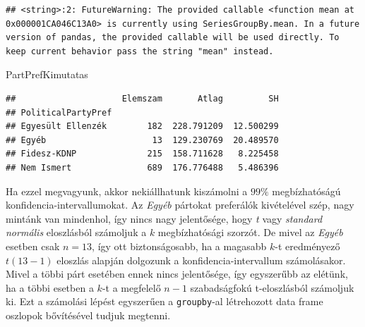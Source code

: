 \documentclass[
]{book}
\newenvironment{Shaded}{\begin{snugshade}}{\end{snugshade}}
\newcommand{\NormalTok}[1]{#1}
\begin{document}
\begin{verbatim}
## <string>:2: FutureWarning: The provided callable <function mean at 0x000001CA046C13A0> is currently using SeriesGroupBy.mean. In a future version of pandas, the provided callable will be used directly. To keep current behavior pass the string "mean" instead.
\end{verbatim}

\begin{Shaded}
\begin{Highlighting}[]
\NormalTok{PartPrefKimutatas}
\end{Highlighting}
\end{Shaded}

\begin{verbatim}
##                     Elemszam       Atlag         SH
## PoliticalPartyPref                                 
## Egyesült Ellenzék        182  228.791209  12.500299
## Egyéb                     13  129.230769  20.489570
## Fidesz-KDNP              215  158.711628   8.225458
## Nem Ismert               689  176.776488   5.486396
\end{verbatim}

Ha ezzel megvagyunk, akkor nekiállhatunk kiszámolni a \(99\%\) megbízhatóságú konfidencia-intervallumokat. Az \emph{Egyéb} pártokat preferálók kivételével szép, nagy mintánk van mindenhol, így nincs nagy jelentősége, hogy \emph{t} vagy \emph{standard normális} eloszlásból számoljuk a \(k\) megbízhatósági szorzót. De mivel az \emph{Egyéb} esetben csak \(n=13\), így ott biztonságosabb, ha a magasabb \(k\)-t eredményező \(t(13-1)\) eloszlás alapján dolgozunk a konfidencia-intervallum számolásakor. Mivel a többi párt esetében ennek nincs jelentősége, így egyszerűbb az elétünk, ha a többi esetben a \(k\)-t a megfelelő \(n-1\) szabadságfokú t-eloszlásból számoljuk ki. Ezt a számolási lépést egyszerűen a \texttt{groupby}-al létrehozott data frame oszlopok bővítésével tudjuk megtenni.
\end{document}
